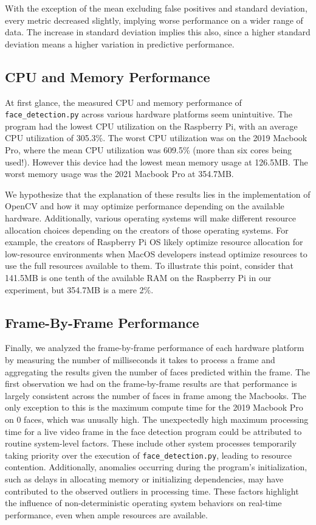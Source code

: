 \documentclass[conference]{IEEEtran}
\begin{document}
With the exception of the mean excluding false positives and standard deviation, every metric decreased slightly, implying worse performance on a wider range of data. The increase in standard deviation implies this also, since a higher standard deviation means a higher variation in predictive performance. 

\subsection{CPU and Memory Performance}

At first glance, the measured CPU and memory performance of \texttt{face\_detection.py} across various hardware platforms seem unintuitive. The program had the lowest CPU utilization on the Raspberry Pi, with an average CPU utilization of 305.3\%. The worst CPU utilization was on the 2019 Macbook Pro, where the mean CPU utilization was 609.5\% (more than six cores being used!). However this device had the lowest mean memory usage at 126.5MB. The worst memory usage was the 2021 Macbook Pro at 354.7MB.

We hypothesize that the explanation of these results lies in the implementation of OpenCV and how it may optimize performance depending on the available hardware. Additionally, various operating systems will make different resource allocation choices depending on the creators of those operating systems. For example, the creators of Raspberry Pi OS likely optimize resource allocation for low-resource environments when MacOS developers instead optimize resources to use the full resources available to them. To illustrate this point, consider that 141.5MB is one tenth of the available RAM on the Raspberry Pi in our experiment, but 354.7MB is a mere 2\%.

\subsection{Frame-By-Frame Performance}

Finally, we analyzed the frame-by-frame performance of each hardware platform by measuring the number of milliseconds it takes to process a frame and aggregating the results given the number of faces predicted within the frame. The first observation we had on the frame-by-frame results are that performance is largely consistent across the number of faces in frame among the Macbooks. The only exception to this is the maximum compute time for the 2019 Macbook Pro on 0 faces, which was unusally high. The unexpectedly high maximum processing time for a live video frame in the face detection program could be attributed to routine system-level factors. These include other system processes temporarily taking priority over the execution of \texttt{face\_detection.py}, leading to resource contention. Additionally, anomalies occurring during the program's initialization, such as delays in allocating memory or initializing dependencies, may have contributed to the observed outliers in processing time. These factors highlight the influence of non-deterministic operating system behaviors on real-time performance, even when ample resources are available. 
\end{document}
